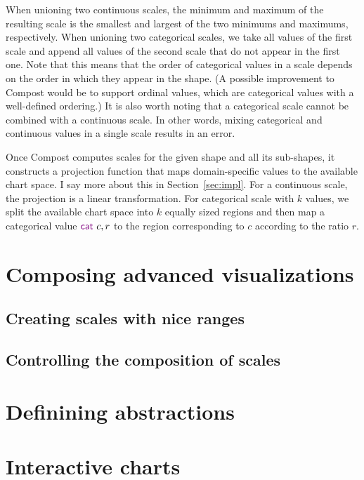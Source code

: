 \documentclass{jfp}
\newcommand{\kvd}[1]{\textnormal{\textcolor{kvdclr}{\sffamily #1}}}
\begin{document}
\vspace{-0.5em}
\noindent
When unioning two continuous scales, the minimum and maximum of the resulting scale is the smallest
and largest of the two minimums and maximums, respectively. When unioning two categorical scales,
we take all values of the first scale and append all values of the second scale that do not appear
in the first one. Note that this means that the order of categorical values in a scale depends on
the order in which they appear in the shape. (A possible improvement to Compost would be to support
ordinal values, which are categorical values with a well-defined ordering.) It is also worth noting
that a categorical scale cannot be combined with a continuous scale. In other words, mixing
categorical and continuous values in a single scale results in an error.

Once Compost computes scales for the given shape and all its sub-shapes, it constructs a projection
function that maps domain-specific values to the available chart space. I say more about this in
Section~\ref{sec:impl}. For a continuous scale, the projection is a linear transformation. For
categorical scale with $k$ values, we split the available chart space into $k$ equally sized
regions and then map a categorical value $\kvd{cat}~c, r$ to the region corresponding to $c$
according to the ratio $r$.

\newpage

\section{Composing advanced visualizations}
\label{sec:fancy}

\subsection{Creating scales with nice ranges}

\subsection{Controlling the composition of scales}

\newpage

\section{Definining abstractions}
\label{sec:abstractions}

\section{Interactive charts}
\end{document}
